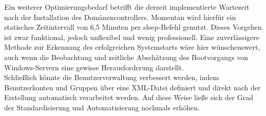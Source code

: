 \documentclass[a4paper,12pt]{article}
\begin{document}
Ein weiterer Optimierungsbedarf betrifft die derzeit implementierte Wartezeit nach der Installation des Domänencontrollers. 
Momentan wird hierfür ein statisches Zeitintervall von 6,5 Minuten per sleep-Befehl genutzt. 
Dieses Vorgehen ist zwar funktional, jedoch unflexibel und wenig professionell. 
Eine zuverlässigere Methode zur Erkennung des erfolgreichen Systemstarts wäre hier wünschenswert, auch wenn die Beobachtung und zeitliche Abschätzung des Bootvorgangs von Windows-Servern eine gewisse Herausforderung darstellt.\\

Schließlich könnte die Benutzerverwaltung verbessert werden, indem Benutzerkonten und Gruppen über eine XML-Datei definiert und direkt nach der Erstellung automatisch verarbeitet werden. 
Auf diese Weise ließe sich der Grad der Standardisierung und Automatisierung nochmals erhöhen.







\end{document}
